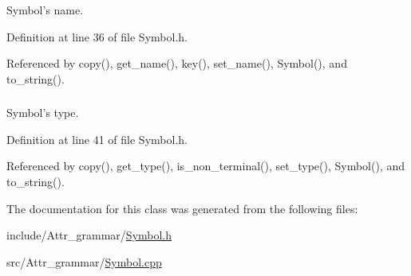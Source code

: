 Symbol's name. 



Definition at line 36 of file Symbol.h.



Referenced by copy(), get\_\-name(), key(), set\_\-name(), Symbol(), and to\_\-string().

\hypertarget{classgenevalmag_1_1Symbol_aa8557500c1049fa8605e3ecebb27f89c}{
\subsubsection[{symb\_\-type}]{}}
\label{classgenevalmag_1_1Symbol_aa8557500c1049fa8605e3ecebb27f89c}


Symbol's type. 



Definition at line 41 of file Symbol.h.



Referenced by copy(), get\_\-type(), is\_\-non\_\-terminal(), set\_\-type(), Symbol(), and to\_\-string().



The documentation for this class was generated from the following files:\begin{DoxyCompactItemize}
\item 
include/Attr\_\-grammar/\hyperlink{Symbol_8h}{Symbol.h}\item 
src/Attr\_\-grammar/\hyperlink{Symbol_8cpp}{Symbol.cpp}\end{DoxyCompactItemize}
